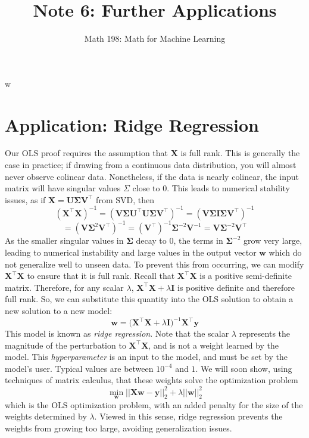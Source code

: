 w\documentclass{article}
\title{Note 6: Further Applications}
\author{Math 198: Math for Machine Learning}
\date{}
\begin{document}
\maketitle

\section*{Application: Ridge Regression}
Our OLS proof requires the assumption that $\mathbf{X}$ is full rank. This is generally the case in practice; if drawing from a continuous data distribution, you will almost never observe colinear data. Nonetheless, if the data is nearly colinear, the input matrix will have singular values $\Sigma$ close to 0. This leads to numerical stability issues, as if $\mathbf{X = U\Sigma V^{\top}}$ from SVD, then $$(\mathbf{X^{\top}X})^{-1} = (\mathbf{V\Sigma U^{\top}U\Sigma V^{\top}})^{-1} = (\mathbf{V\Sigma I\Sigma V^{\top}})^{-1}$$ $$= (\mathbf{V\Sigma}^2\mathbf{V^{\top}})^{-1} = (\mathbf{V^{\top}})^{-1}\mathbf{\Sigma}^{-2}\mathbf{V}^{-1} = \mathbf{V\Sigma}^{-2}\mathbf{V}^{\top}$$ As the smaller singular values in $\mathbf{\Sigma}$ decay to 0, the terms in $\mathbf{\Sigma}^{-2}$ grow very large, leading to numerical instability and large values in the output vector $\mathbf{w}$ which do not generalize well to unseen data. To prevent this from occurring, we can modify $\mathbf{X^{\top}X}$ to ensure that it is full rank. Recall that $\mathbf{X^{\top}X}$ is a positive semi-definite matrix. Therefore, for any scalar $\lambda$, $\mathbf{X^{\top}X} + \lambda\mathbf{I}$ is positive definite and therefore full rank. So, we can substitute this quantity into the OLS solution to obtain a new solution to a new model: $$\mathbf{w} = \mathbf{(X^{\top}X} + \lambda\mathbf{I})^{-1}\mathbf{X^{\top}y}$$ This model is known as \textit{ridge regression}. Note that the scalar $\lambda$ represents the magnitude of the perturbation to $\mathbf{X^{\top}X}$, and is not a weight learned by the model. This \textit{hyperparameter} is an input to the model, and must be set by the model's user. Typical values are between $10^{-4}$ and $1$. We will soon show, using techniques of matrix calculus, that these weights solve the optimization problem $$\min\limits_{\mathbf{w}} ||\mathbf{Xw - y}||_2^2 + \lambda ||\mathbf{w}||_2^2$$ which is the OLS optimization problem, with an added penalty for the size of the weights determined by $\lambda$. Viewed in this sense, ridge regression prevents the weights from growing too large, avoiding generalization issues.
\end{document}
